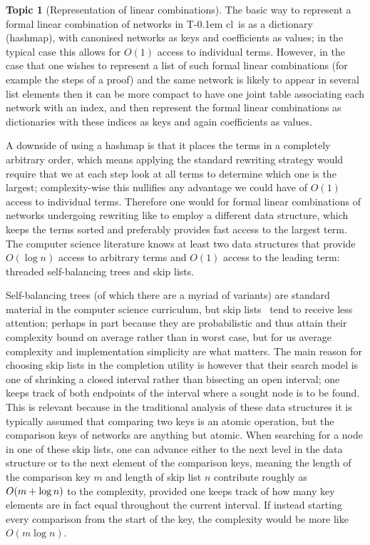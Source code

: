 \documentclass{article}
\theoremstyle{definition}
\newtheorem{topic}{Topic}
\newcommand{\Tcl}{T\kern-0.1em cl}
\begin{document}
\begin{topic}[Representation of linear combinations] 
  \label{Topic:LinComb}
  The basic way to represent a formal linear combination of networks 
  in \Tcl\ is as a dictionary (hashmap), with canonised networks as 
  keys and coefficients as values; in the typical case this allows 
  for $O(1)$ access to individual terms. However, in the case that 
  one wishes to represent a list of such formal linear combinations 
  (for example the steps of a proof) and the same network is likely 
  to appear in several list elements then it can be more compact to 
  have one joint table associating each network with an index, and 
  then represent the formal linear combinations as dictionaries with 
  these indices as keys and again coefficients as values.
  
  A downside of using a hashmap is that it places the terms in a 
  completely arbitrary order, which means applying the standard 
  rewriting strategy would require that we at each step look at all 
  terms to determine which one is the largest; complexity-wise this 
  nullifies any advantage we could have of $O(1)$ access to 
  individual terms. Therefore one would for formal linear 
  combinations of networks undergoing rewriting like to employ a 
  different data structure, which keeps the terms sorted and 
  preferably provides fast access to the largest term. The computer 
  science literature knows at least two data structures that provide 
  $O(\log n)$ access to arbitrary terms and $O(1)$ access to the 
  leading term: threaded self-balancing trees and skip lists.
  
  Self-balancing trees (of which there are a myriad of variants) are 
  standard material in the computer science curriculum, but 
  skip lists~\cite{skiplist} tend to receive less attention; perhaps 
  in part because they are probabilistic and thus attain their 
  complexity bound on average rather than in worst case, but for us 
  average complexity and implementation simplicity are what matters. 
  The main reason for choosing skip lists in the completion 
  utility is however that their search model is one of shrinking a 
  closed interval rather than bisecting an open interval; one keeps 
  track of both endpoints of the interval where a sought node is to 
  be found. This is relevant because in the traditional analysis 
  of these data structures it is typically assumed that comparing two 
  keys is an atomic operation, but the comparison keys of networks 
  are anything but atomic. When searching for a node in one of these 
  skip lists, one can advance either to the next level in the data 
  structure or to the next element of the comparison keys, meaning 
  the length of the comparison key $m$ and length of skip list $n$ 
  contribute roughly as $O(m +\nobreak \log n)$ to the complexity, 
  provided one keeps track of how many key elements are in fact equal 
  throughout the current interval. If instead starting every 
  comparison from the start of the key, the complexity would be more 
  like $O(m \log n)$.
  

\end{topic}
\end{document}
